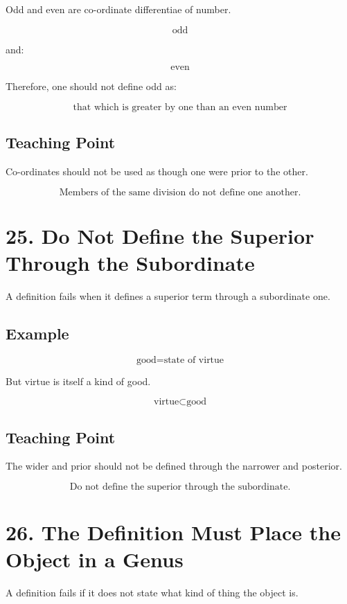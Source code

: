 \documentclass[12pt]{article}
\begin{document}
Odd and even are co-ordinate differentiae of number.

\[
\text{odd}
\]

and:

\[
\text{even}
\]

Therefore, one should not define odd as:

\[
\text{that which is greater by one than an even number}
\]

\subsection*{Teaching Point}

Co-ordinates should not be used as though one were prior to the other.

\[
\boxed{
\text{Members of the same division do not define one another.}
}
\]

\section*{25. Do Not Define the Superior Through the Subordinate}

A definition fails when it defines a superior term through a subordinate one.

\subsection*{Example}

\[
\text{good} = \text{state of virtue}
\]

But virtue is itself a kind of good.

\[
\text{virtue} \subset \text{good}
\]

\subsection*{Teaching Point}

The wider and prior should not be defined through the narrower and posterior.

\[
\boxed{
\text{Do not define the superior through the subordinate.}
}
\]

\section*{26. The Definition Must Place the Object in a Genus}

A definition fails if it does not state what kind of thing the object is.
\end{document}
